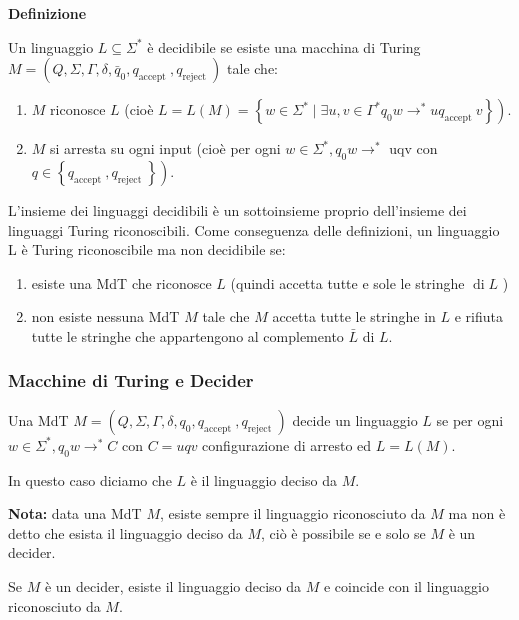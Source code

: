 \vspace{5mm}

\textbf{Definizione}

Un linguaggio $L \subseteq \Sigma^{*}$ è decidibile se esiste una macchina di Turing $M=\left(Q, \Sigma, \Gamma, \delta, \bar{q}_{0}, q_{\text {accept }}, q_{\text {reject }}\right)$ tale che:
\begin{enumerate}
    \item $M$ riconosce $L$
(cioè $\left.L=L(M)=\left\{w \in \Sigma^{*} \mid \exists u, v \in \Gamma^{*} q_{0} w \rightarrow^{*} u q_{\text {accept }} v\right\}\right)$.
    \item $M$ si arresta su ogni input (cioè per ogni $w \in \Sigma^{*}, q_{0} w \rightarrow^{*}$ uqv con $\left.q \in\left\{q_{\text {accept }}, q_{\text {reject }}\right\}\right)$.
\end{enumerate}

L'insieme dei linguaggi decidibili è un sottoinsieme proprio dell'insieme dei linguaggi Turing riconoscibili.
Come conseguenza delle definizioni, un linguaggio L è Turing riconoscibile ma non decidibile se:
\begin{enumerate}
    \item esiste una MdT che riconosce $L$ (quindi accetta tutte e sole le stringhe $\operatorname{di} L$ )
    \item non esiste nessuna MdT $M$ tale che $M$ accetta tutte le stringhe in $L$ e rifiuta tutte le stringhe che appartengono al complemento $\bar{L}$ di $L$.
\end{enumerate}

\subsubsection{Macchine di Turing e Decider}

Una MdT $M=\left(Q, \Sigma, \Gamma, \delta, q_{0}, q_{\text {accept }}, q_{\text {reject }}\right)$ decide un linguaggio $L$ se per ogni $w \in \Sigma^{*}, q_{0} w \rightarrow^{*} C$ con $C=u q v$ configurazione di arresto ed $L=L(M)$.

In questo caso diciamo che $L$ è il linguaggio deciso da $M$.

\vspace{5mm}

\textbf{Nota:} data una MdT $M$, esiste sempre il linguaggio riconosciuto da $M$ ma non è detto che esista il linguaggio deciso da $M$, ciò è possibile se e solo se $M$ è un decider.

Se $M$ è un decider, esiste il linguaggio deciso da $M$ e coincide con il linguaggio riconosciuto da $M$.

